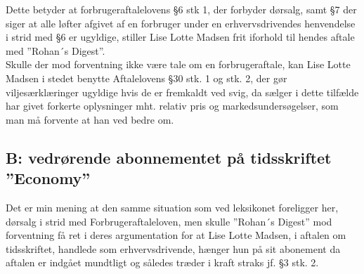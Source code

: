 \documentclass[11pt, a4paper]{article}
\begin{document}
Dette betyder at forbrugeraftalelovens §6 stk 1, der forbyder dørsalg, samt §7
der siger at alle løfter afgivet af en forbruger under en erhvervsdrivendes
henvendelse i strid med §6 er ugyldige, stiller Lise Lotte Madsen frit iforhold
til hendes aftale med ”Rohan´s Digest”.\\
Skulle der mod forventning ikke være tale om en forbrugeraftale, kan Lise Lotte
Madsen i stedet benytte Aftalelovens §30 stk. 1 og stk. 2, der gør
viljesærklæringer ugyldige hvis de er fremkaldt ved svig, da sælger i dette
tilfælde har givet forkerte oplysninger mht. relativ pris og
markedsundersøgelser, som man må forvente at han ved bedre om.

\subsection*{B: vedrørende abonnementet på tidsskriftet ”Economy”}
Det er min mening at den samme situation som ved leksikonet foreligger her,
dørsalg i strid med Forbrugeraftaleloven, men skulle ”Rohan´s Digest” mod
forventning få ret i deres argumentation for at Lise Lotte Madsen, i aftalen om
tidsskriftet, handlede som erhvervsdrivende, hænger hun på sit abonement da
aftalen er indgået mundtligt og således træder i kraft straks jf. §3 stk. 2.


\end{document}
